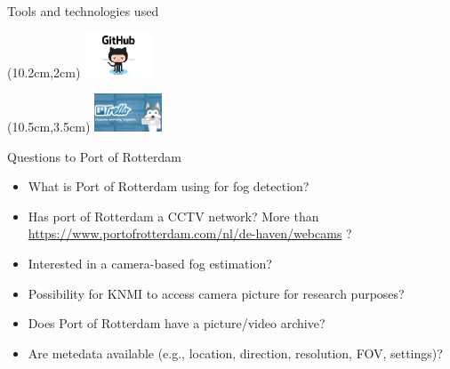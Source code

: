 \documentclass[10pt,fleqn]{beamer}\usepackage[]{graphicx}\usepackage[]{color}
\begin{document}
\begin{frame}{Tools and technologies used}
\begin{textblock*}{2cm}(10.2cm,2cm)
 \includegraphics[width=2cm]{figure/Git_logo}
\end{textblock*}

\begin{textblock*}{2cm}(10.5cm,3.5cm)
 \includegraphics[width=2cm]{figure/trello}
\end{textblock*}


\end{frame}



\begin{frame}{Questions to Port of Rotterdam}
 \begin{itemize}
\item{What is Port of Rotterdam using for fog detection?}
\item{Has port of Rotterdam a CCTV network? More than \scriptsize{\url{https://www.portofrotterdam.com/nl/de-haven/webcams}} ?}
\item{Interested in a camera-based fog estimation?}
\item{Possibility for KNMI to access camera picture for research purposes?}
\item{Does Port of Rotterdam have a picture/video archive?}
\item{Are metedata available (e.g., location, direction, resolution, FOV, settings)?}
\end{itemize}
\end{frame}















% 
\end{document}
